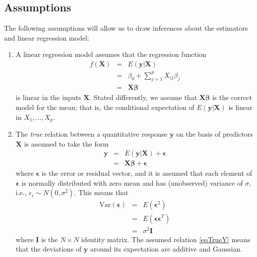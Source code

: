 \documentclass[11pt]{article}
\theoremstyle{remark}
\begin{document}
\subsection{Assumptions}
The following assumptions will allow us to draw inferences about the estimators and linear regression model:
\begin{enumerate}
\item A linear regression model assumes that the regression function
\begin{eqnarray}
f(\mathbf{X}) &=& E(\mathbf{y}|\mathbf{X})\nonumber\\
&=& \beta_0 + \sum_{j=1}^p X_{ij}\beta_j\nonumber\\
&=& \mathbf{X}\boldsymbol{\beta}\label{eqLinearRegressionFunction}
\end{eqnarray}
is linear in the inputs $\mathbf{X}$. Stated differently, we assume that $\mathbf{X}\boldsymbol{\beta}$ is the correct model for the mean; that is, the conditional expectation of $E(\mathbf{y}|\mathbf{X})$ is linear in $X_1,\hdots,X_p$.
\item The \emph{true} relation between a quantitative response $\mathbf{y}$ on the basis of predictors $\mathbf{X}$ is assumed to take the form
\begin{eqnarray}
\mathbf{y} &=& E(\mathbf{y}|\mathbf{X}) + \boldsymbol{\epsilon}\nonumber\\
&=& \mathbf{X}\boldsymbol{\beta} + \boldsymbol{\epsilon}\label{eqTrueY}
\end{eqnarray}
where $\boldsymbol{\epsilon}$ is the error or residual vector, and it is assumed that each element of $\boldsymbol{\epsilon}$ is normally distributed with zero mean and has (unobserved) variance of $\sigma$, i.e., $\epsilon_i \sim N(0,\sigma^2)$. This means that
\begin{eqnarray}
\text{Var}(\boldsymbol{\epsilon}) &=& E(\boldsymbol{\epsilon}^2)\nonumber\\
&=& E(\boldsymbol{\epsilon}\boldsymbol{\epsilon}^T)\nonumber\\
&=& \sigma^2\mathbf{I}\label{VarError}
\end{eqnarray}
where $\mathbf{I}$ is the $N \times N$ identity matrix. The assumed relation \eqref{eqTrueY} means that the deviations of $\mathbf{y}$ around its expectation are additive and Gaussian.
\end{enumerate}
\end{document}
